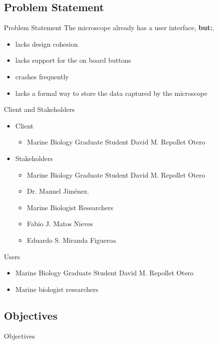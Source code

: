 \documentclass[14pt, aspectratio=169]{beamer}
\begin{document}
\subsection{Problem Statement}
\begin{frame}{Problem Statement}
	The microscope already has a user interface, \large\textbf{but:}\textnormal.
	\begin{itemize}
		\item lacks design cohesion
		\item lacks support for the on board buttons
		\item crashes frequently
		\item lacks a formal way to store the data captured by the microscope
	\end{itemize}
\end{frame}
\begin{frame}{Client and Stakeholders}
	\begin{itemize}
		\item Client
		      \begin{itemize}
			      \item Marine Biology Graduate Student David M. Repollet Otero
		      \end{itemize}
		\item Stakeholders
		      \begin{itemize}
			      \item Marine Biology Graduate Student David M. Repollet Otero
			      \item Dr. Manuel Jiménez.
			      \item Marine Biologist Researchers
			      \item Fabio J. Matos Nieves
			      \item Eduardo S. Miranda Figueroa
		      \end{itemize}
	\end{itemize}
\end{frame}
\begin{frame}{Users}
	\begin{itemize}
	\item Marine Biology Graduate Student David M. Repollet Otero
	\item Marine biologist researchers
	\end{itemize}
\end{frame}
\subsection{Objectives}
\begin{frame}{Objectives}

\end{frame}
\end{document}
